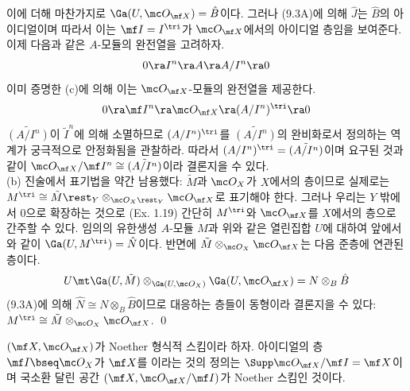 \begin{proposition}
	이에 더해 마찬가지로 $\Ga(U,\mc O_{\mf X})=\hat B$이다. 그러나 (9.3A)에 의해 $\hat J$는 $\hat B$의 아이디얼이며
	따라서 이는 $\mf I=I^\tri$가 $\mc O_{\mf X}$에서의 아이디얼 층임을 보여준다.\\
	이제 다음과 같은 $A$-모듈의 완전열을 고려하자.
	$$0\ra I^n\ra A\ra A/I^n\ra 0$$
	이미 증명한 (c)에 의해 이는 $\mc O_{\mf X}$-모듈의 완전열을 제공한다.
	$$0\ra\mf I^n\ra\mc O_{\mf X}\ra(A/I^n)^\tri\ra 0$$
	$\tilde{(A/I^n)}$이 $\tilde I^n$에 의해 소멸하므로 $(A/I^n)^\tri$를
	$\tilde{(A/I^n)}$의 완비화로서 정의하는 역계가 궁극적으로 안정화됨을 관찰하라.
	따라서 $(A/I^n)^\tri=\tilde{(A/I^n)}$이며 요구된 것과 같이 $\mc O_{\mf X}/\mf I^n\cong\tilde{(A/I^n)}$이라 결론지을 수 있다.\\
	(b) 진술에서 표기법을 약간 남용했다: $\tilde M$과 $\mc O_X$가 $X$에서의 층이므로
	실제로는 $M^\tri\cong\tilde M\rest_Y\otimes_{\mc O_X\rest_Y}\mc O_{\mf X}$로 표기해야 한다.
	그러나 우리는 $Y$ 밖에서 0으로 확장하는 것으로 (Ex. 1.19) 간단히 $M^\tri$와 $\mc O_{\mf X}$를 $X$에서의 층으로 간주할 수 있다.
	임의의 유한생성 $A$-모듈 $M$과 위와 같은 열린집합 $U$에 대하여 앞에서와 같이 $\Ga(U,M^\tri)=\hat N$이다.
	반면에 $\tilde M\otimes_{\mc O_X}\mc O_{\mf X}$는 다음 준층에 연관된 층이다.
	$$U\mt\Ga(U,\tilde M)\otimes_{\Ga(U,\mc O_X)}\Ga(U,\mc O_{\mf X})=N\otimes_B\hat B$$
	(9.3A)에 의해 $\hat N\cong N\otimes_B\hat B$이므로 대응하는 층들이 동형이라 결론지을 수 있다:
	$M^\tri\cong\tilde M\otimes_{\mc O_X}\mc O_{\mf X}$.
	\qed
	\end{proposition}
	
	
	\begin{definition}
	$(\mf X,\mc O_{\mf X})$가 Noether 형식적 스킴이라 하자. 아이디얼의 층 $\mf I\bseq\mc O_X$가 $\mf X$를
	이라는 것의 정의는 $\Supp\mc O_{\mf X}/\mf I=\mf X$이며
	국소환 달린 공간 $(\mf X,\mc O_{\mf X}/\mf I)$가 Noether 스킴인 것이다.
	\end{definition}
	

